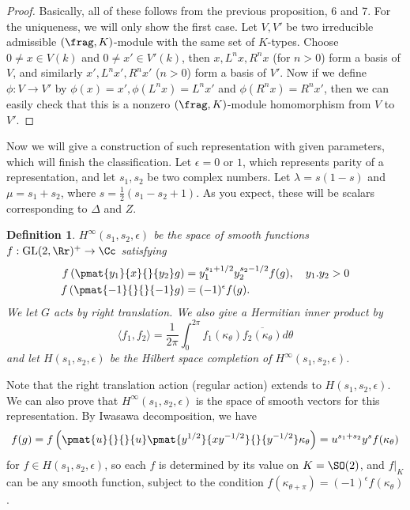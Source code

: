 \documentclass{article}
\newtheorem{definition}{Definition}[section]
\newcommand{\GL}{\mathrm{GL}}
\begin{document}
\begin{proof}
Basically, all of these follows from the previous proposition, 6 and 7. For the uniqueness, we will only show the first case. 
Let $V, V'$ be two irreducible admissible $(\frag, K)$-module with the same set of $K$-types. 
Choose $0\neq x\in V(k)$ and $0\neq x'\in V'(k)$, then $x, L^{n}x, R^{n}x$ (for $n>0$) form a basis of $V$, and similarly $x', L^{n}x', R^{n}x'$ ($n>0$) form a basis of $V'$. 
Now if we define $\phi:V\to V'$ by $\phi(x) = x', \phi(L^{n}x) = L^{n}x'$ and $\phi(R^{n}x) = R^{n}x'$, then we can easily check that this is a nonzero $(\frag, K)$-module homomorphism from $V$ to $V'$. 
\end{proof}


Now we will give a construction of such representation with given parameters, which will finish the classification. Let $\epsilon = 0$ or $1$, which represents parity of a representation, and let $s_{1}, s_{2}$ be two complex numbers. Let $\lambda = s(1-s)$ and $\mu = s_{1} + s_{2}$, where $s = \frac{1}{2}(s_{1} - s_{2} + 1)$. As you expect, these will be scalars corresponding to $\Delta$ and $Z$. 

\begin{definition}
$H^{\infty}(s_{1}, s_{2}, \epsilon)$ be the space of smooth functions $f:\GL(2, \Rr)^{+}\to \Cc$ satisfying 
\begin{align*}
f\left(\pmat{y_{1}}{x}{}{y_{2}} g\right) &= y_{1}^{s_{1} + 1/2}y_{2}^{s_{2} - 1/2}f(g), \quad y_{1}. y_{2} >0 \\
f\left( \pmat{-1}{}{}{-1}g \right) &= (-1)^{\epsilon} f(g).
\end{align*}
We let $G$ acts by right translation. We also give a Hermitian inner product by 
$$
\langle f_{1}, f_{2}\rangle = \frac{1}{2\pi} \int_{0}^{2\pi} f_{1}(\kappa_{\theta})\overline{f_{2}(\kappa_{\theta})} d\theta
$$
and let $H(s_{1}, s_{2}, \epsilon)$ be the Hilbert space completion of $H^{\infty}(s_{1}, s_{2}, \epsilon)$. 
\end{definition}
Note that the right translation action (regular action) extends to $H(s_{1}, s_{2}, \epsilon)$. We can also prove that $H^{\infty}(s_{1}, s_{2}, \epsilon)$ is the space of smooth vectors for this representation. 
By Iwasawa decomposition, we have 
$$
f(g) = f\left( \pmat{u}{}{}{u} \pmat{y^{1/2}}{xy^{-1/2}}{}{y^{-1/2}} \kappa_{\theta}\right) = u^{s_{1} + s_{2}} y^{s} f(\kappa_{\theta})
$$
for $f\in H(s_{1}, s_{2}, \epsilon)$, so each $f$ is determined by its value on $K = \SO(2)$, and $f|_{K}$ can be any smooth function, subject to the condition $f(\kappa_{\theta+ \pi}) = (-1)^{\epsilon}f(\kappa_{\theta})$. 
\end{document}
